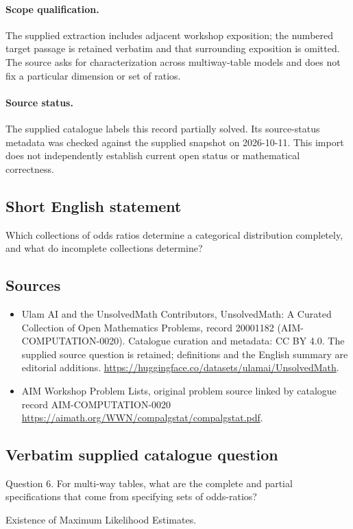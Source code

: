 \documentclass[11pt]{article}
\begin{document}
\paragraph{Scope qualification.}
The supplied extraction includes adjacent workshop exposition; the numbered target passage is retained verbatim and that surrounding exposition is omitted. The source asks for characterization across multiway-table models and does not fix a particular dimension or set of ratios.
\paragraph{Source status.}
The supplied catalogue labels this record partially solved. Its source-status metadata was checked against the supplied snapshot on 2026-10-11. This import does not independently establish current open status or mathematical correctness.
\subsection{Short English statement}
Which collections of odds ratios determine a categorical distribution completely, and what do incomplete collections determine?
\subsection{Sources}
\begin{itemize}
\item[S1] Ulam AI and the UnsolvedMath Contributors, UnsolvedMath: A Curated Collection of Open Mathematics Problems, record 20001182 (AIM-COMPUTATION-0020). Catalogue curation and metadata: CC BY 4.0. The supplied source question is retained; definitions and the English summary are editorial additions.
\url{https://huggingface.co/datasets/ulamai/UnsolvedMath}.
\item[S2] AIM Workshop Problem Lists, original problem source linked by catalogue record AIM-COMPUTATION-0020
\url{https://aimath.org/WWN/compalgstat/compalgstat.pdf}.
\end{itemize}
\subsection{Verbatim supplied catalogue question}
Question 6. For multi-way tables, what are the complete and partial specifications that come from specifying sets of odds-ratios?

Existence of Maximum Likelihood Estimates.
\end{document}
